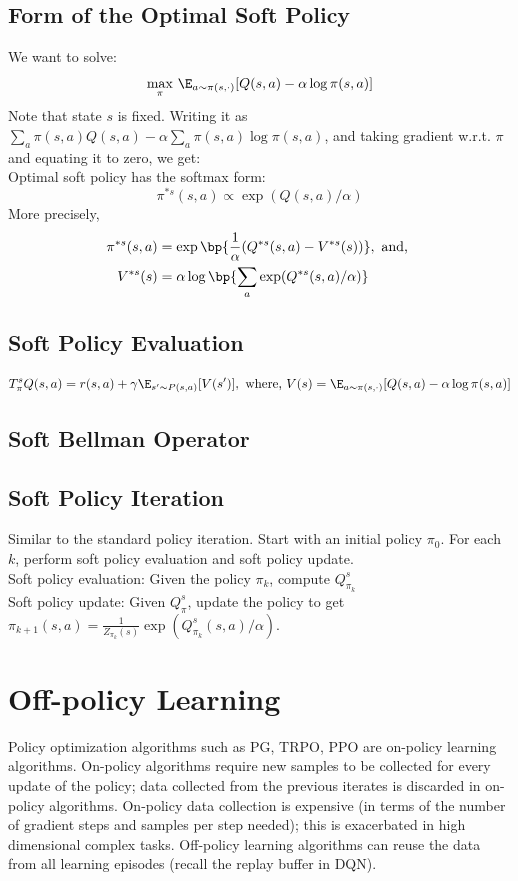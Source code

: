 \subsection{Form of the Optimal Soft Policy}
We want to solve:
\[
  \max_{\pi} \, \E_{a \sim \pi(s, \cdot)}[Q(s,a) - \alpha \log \pi(s, a)]
\]
Note that state $s$ is fixed. Writing it as $\sum_a \pi(s, a) Q(s, a) - \alpha \sum_{a} \pi(s, a) \log \pi(s, a)$, and taking gradient w.r.t. $\pi$ and equating it to zero, we get: \\

\noindent Optimal soft policy has the softmax form:
\[
  \pi^{*s} (s, a) \propto \exp(Q(s, a)/\alpha)
\]
More precisely,
\begin{align*}
  \pi^{*s}(s,a) & = \exp \bp{\frac{1}{\alpha}(Q^{*s}(s, a) - V^{*s}(s))}, \text{ and, } \\
  V^{*s}(s)     & = \alpha \log \bp{\sum_{a} \exp(Q^{*s}(s,a)/\alpha)}
\end{align*}

\subsection{Soft Policy Evaluation}
\[
  T_{\pi}^s Q(s,a) = r(s,a) + \gamma \E_{s^{\prime}\sim P(s,a)}[V(s^{\prime})], \text{ where, } V(s) = \E_{a\sim\pi(s,\cdot)} [Q(s,a) - \alpha \log \pi(s, a)]
\]
\subsection{Soft Bellman Operator}

\subsection{Soft Policy Iteration}
Similar to the standard policy iteration. Start with an initial policy $\pi_0$. For each $k$,
perform soft policy evaluation and soft policy update. \\

\noindent Soft policy evaluation: Given the policy $\pi_k$, compute $Q_{\pi_k}^s$ \\

\noindent Soft policy update: Given $Q_\pi^s$, update the policy to get $\pi_{k+1}(s,a) = \frac{1}{Z_{\pi_k}(s)}\exp(Q_{\pi_k}^s(s,a) / \alpha)$.

\section{Off-policy Learning}
Policy optimization algorithms such as PG, TRPO, PPO are on-policy learning algorithms. On-policy algorithms require new samples to be collected for every update
of the policy; data collected from the previous iterates is discarded in on-policy algorithms. On-policy data collection is expensive (in terms
of the number of gradient steps and samples per step needed); this is exacerbated in high dimensional complex tasks. Off-policy learning algorithms can reuse the
data from all learning episodes (recall the replay buffer in DQN). \\

